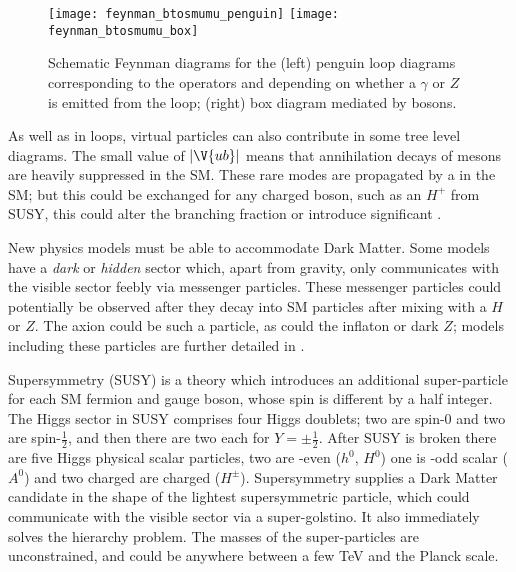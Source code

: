 \begin{figure}
  \begin{center}
    \texttt{[image: feynman\_btosmumu\_penguin]}
    \texttt{[image: feynman\_btosmumu\_box]}
    \caption[Schematic Feynman diagrams for loop and box diagrams]
    {\small
      Schematic Feynman diagrams for the
      (left) penguin loop diagrams corresponding to the operators  and  depending on
      whether a $\gamma$ or $Z$ is emitted from the loop;
      (right)  box diagram mediated by \Wp bosons.
    }
    \label{fig:hhh:loops}
  \end{center}
\end{figure}

As well as in loops, virtual particles can also contribute in some tree level diagrams.
The small value of $|\V{ub}|$ means that annihilation decays of \Bp mesons are heavily
suppressed in the SM.
These rare modes are propagated by a \Wp in the SM; but this could be exchanged for any charged
boson, such as an $H^+$ from SUSY, this could alter the branching fraction or
introduce significant \CPV.

New physics models must be able to accommodate Dark Matter.
Some models have a \emph{dark} or \emph{hidden} sector which, apart from gravity, only
communicates with the visible sector feebly via messenger particles.
These messenger particles could potentially be observed after they decay into SM particles after
mixing with a $H$ or $Z$.
The axion could be such a particle, as could the inflaton or dark $Z$; models including these
particles are further detailed in .

Supersymmetry (SUSY) is a theory which introduces an additional super-particle for each SM fermion and
gauge boson, whose spin is different by a half integer.
The Higgs sector in SUSY comprises four Higgs doublets; two are spin-0 and two are spin-$\tfrac12$,
and then there are two each for $Y=\pm\tfrac12$.
After SUSY is broken there are five Higgs physical scalar particles, two are \CP-even ($h^0$,
$H^0$) one is \CP-odd scalar ($A^0$) and two charged are charged ($H^\pm$).
Supersymmetry supplies a Dark Matter candidate in the shape of the lightest supersymmetric
particle, which could communicate with the visible sector via a super-golstino.
It also immediately solves the hierarchy problem.
The masses of the super-particles are unconstrained, and could be anywhere between a few TeV and
the Planck scale.


